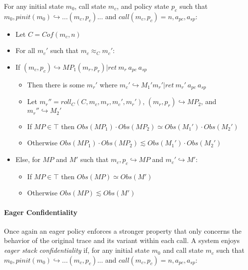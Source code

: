 \documentclass[conference]{IEEEtran}
\newcommand{\MP}{\mathit{MP}}
\begin{document}
      For any initial state \(m_0\), call state \(m_c\), and policy state \(p_c\) such that
      \(m_0,\mathit{pinit}(m_0) \hookrightarrow ... (m_c,p_c) ...\) and
      \(\mathit{call}(m_c,p_c) = n, a_{pc}, a_{sp}\):

      \begin{itemize}
        \item Let \(C = \mathit{Cof}(m_c,n)\)
        \item For all \(m_c'\) such that \(m_c \approx_C m_c'\):
        \item If \((m_c,p_c) \hookrightarrow \MP_1 (m_r,p_r) | \mathit{ret}\ m_r\ a_{pc}\ a_{sp}\)
          \begin{itemize}
            \item Then there is some \(m_r'\) where
              \(m_c' \hookrightarrow M_1' m_r' | \mathit{ret}\ m_r'\ a_{pc}\ a_{sp}\)
            \item Let \(m_r'' = \mathit{roll}_C(C,m_c,m_r,m_c',m_r')\),
              \((m_r,p_r) \hookrightarrow \MP_2\), and \(m_r'' \hookrightarrow M_2'\)
            \item If \(\MP \in \top\) then \(\mathit{Obs}(\MP_1) \cdot \mathit{Obs}(\MP_2) \simeq
              \mathit{Obs}(M_1') \cdot \mathit{Obs}(M_2')\)
            \item Otherwise \(\mathit{Obs}(\MP_1) \cdot \mathit{Obs}(\MP_2) \lesssim
              \mathit{Obs}(M_1') \cdot \mathit{Obs}(M_2')\)
          \end{itemize}
        \item Else, for \(\MP\) and \(M'\) such that \(m_c,p_c \hookrightarrow \MP\) and \(m_c' \hookrightarrow M'\):
          \begin{itemize}
            \item If \(\MP \in \top\) then \(\mathit{Obs}(\MP) \simeq \mathit{Obs}(M')\)
            \item Otherwise \(\mathit{Obs}(\MP) \lesssim \mathit{Obs}(M')\)
          \end{itemize}
      \end{itemize}

    \paragraph{Eager Confidentiality}

      Once again an eager policy enforces a stronger property that only concerns the behavior of
      the original trace and its variant within each call. A system enjoys {\it eager stack
      confidentiality} if, for any initial state \(m_0\) and call state \(m_c\) such that
      \(m_0,\mathit{pinit}(m_0) \hookrightarrow ... (m_c,p_c) ...\) and
      \(\mathit{call}(m_c,p_c) = n, a_{pc}, a_{sp}\):
\end{document}
